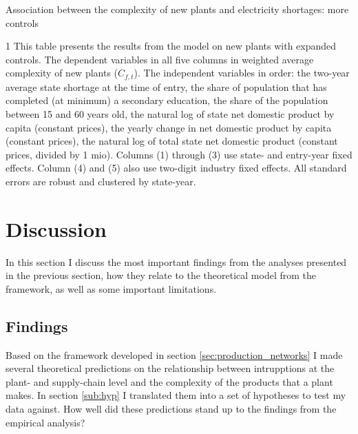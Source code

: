 \documentclass[11pt]{article}
\begin{document}
\begin{table} 
	\begin{center}
		\begin{threeparttable}
			\caption{Association between the complexity of new plants and electricity shortages: more controls}
			\label{tab:entry_max_avg}
			
			\begin{tablenotes} \footnotesize 
			\item[1] This table presents the results from the model on new plants with expanded controls. The dependent variables in all five columns in weighted average complexity of new plants ($C_{f,t}$). The independent variables in order: the two-year average state shortage at the time of entry, the share of population that has completed (at minimum) a secondary education, the share of the population between 15 and 60 years old, the natural log of state net domestic product by capita (constant prices), the yearly change in net domestic product by capita (constant prices), the natural log of total state net domestic product (constant prices, divided by 1 mio). Columns (1) through (3) use state- and entry-year fixed effects. Column (4) and (5) also use two-digit industry fixed effects. All standard errors are robust and clustered by state-year.
			\end{tablenotes}
		\end{threeparttable}
	\end{center}
\end{table}   



\newpage


\section{Discussion}%
\label{sec:discussion}
In this section I discuss the most important findings from the analyses presented in the previous section, how they relate to the theoretical model from the framework, as well as some important limitations. 

\subsection{Findings}
\label{sub:findings}

Based on the framework developed in section \ref{sec:production_networks} I made several theoretical predictions on the relationship between intrupptions at the plant- and supply-chain level and the complexity of the products that a plant makes. In section \ref{sub:hyp} I translated them into a set of hypotheses to test my data against. How well did these predictions stand up to the findings from the empirical analysis? 
\end{document}
